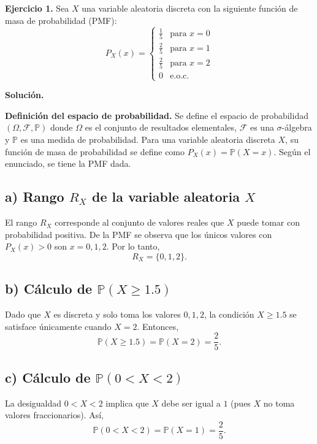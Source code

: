 \documentclass[letterpaper, 12pt]{article}
\begin{document}
    \textbf{Ejercicio 1.} Sea \( X \) una variable aleatoria discreta con la siguiente función de masa de probabilidad (PMF):
    \[
    P_X(x) = 
    \begin{cases} 
    \frac{1}{5} & \text{para } x = 0 \\
    \frac{2}{5} & \text{para } x = 1 \\
    \frac{2}{5} & \text{para } x = 2 \\
    0 & \text{e.o.c.}
    \end{cases}
    \]

    \textbf{Solución.}

    \textbf{Definición del espacio de probabilidad.} Se define el espacio de probabilidad \((\Omega, \mathcal{F}, \mathbb{P})\) donde \(\Omega\) es el conjunto de resultados elementales, \(\mathcal{F}\) es una \(\sigma\)-álgebra y \(\mathbb{P}\) es una medida de probabilidad. Para una variable aleatoria discreta \(X\), su función de masa de probabilidad se define como \(P_X(x) = \mathbb{P}(X = x)\). Según el enunciado, se tiene la PMF dada.

    \subsection*{a) Rango \(R_X\) de la variable aleatoria \(X\)}
    El rango \(R_X\) corresponde al conjunto de valores reales que \(X\) puede tomar con probabilidad positiva. De la PMF se observa que los únicos valores con \(P_X(x) > 0\) son \(x = 0, 1, 2\). Por lo tanto,
    \[
    R_X = \{0, 1, 2\}.
    \]

    \subsection*{b) Cálculo de \(\mathbb{P}(X \geq 1.5)\)}
    Dado que \(X\) es discreta y solo toma los valores \(0, 1, 2\), la condición \(X \geq 1.5\) se satisface únicamente cuando \(X = 2\). Entonces,
    \[
    \mathbb{P}(X \geq 1.5) = \mathbb{P}(X = 2) = \frac{2}{5}.
    \]

    \subsection*{c) Cálculo de \(\mathbb{P}(0 < X < 2)\)}
    La desigualdad \(0 < X < 2\) implica que \(X\) debe ser igual a \(1\) (pues \(X\) no toma valores fraccionarios). Así,
    \[
    \mathbb{P}(0 < X < 2) = \mathbb{P}(X = 1) = \frac{2}{5}.
    \]
\end{document}
